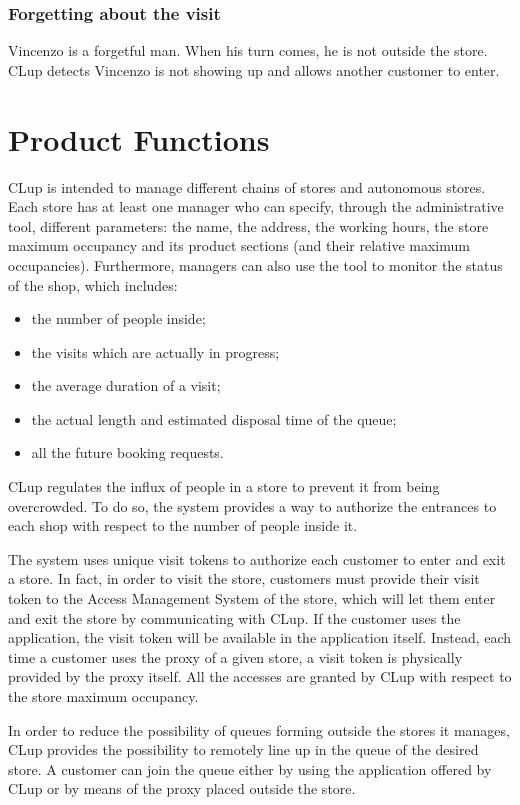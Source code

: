 \documentclass[a4paper,oneside,11pt]{book}   %
\begin{document}
        \subsubsection{Forgetting about the visit}
        Vincenzo is a forgetful man. When his turn comes, he is not outside the store. CLup detects Vincenzo is not showing up and allows another customer to enter.
    
    \newpage
    \section{Product Functions}
    CLup is intended to manage different chains of stores and autonomous stores. Each store has at least one manager who can specify, through the administrative tool, different parameters: the name, the address, the working hours, the store maximum occupancy and its product sections (and their relative maximum occupancies). Furthermore, managers can also use the tool to monitor the status of the shop, which includes:
    \begin{itemize}
        \item the number of people inside;
        \item the visits which are actually in progress;
        \item the average duration of a visit;
        \item the actual length and estimated disposal time of the queue;
        \item all the future booking requests.
    \end{itemize}
    CLup regulates the influx of people in a store to prevent it from being overcrowded. To do so, the system  provides a way to authorize the entrances to each shop with respect to the number of people inside it. \par
    The system uses unique visit tokens to authorize each customer to enter and exit a store. In fact, in order to visit the store, customers must provide their visit token to the Access Management System of the store, which will let them enter and exit the store by communicating with CLup. If the customer uses the application, the visit token will be available in the application itself. Instead, each time a customer uses the proxy of a given store, a visit token is physically provided by the proxy itself. All the accesses are granted by CLup with respect to the store maximum occupancy. \par
    In order to reduce the possibility of queues forming outside the stores it manages, CLup provides the possibility to remotely line up in the queue of the desired store. A customer can join the queue either by using the application offered by CLup or by means of the proxy placed outside the store. \par
\end{document}
